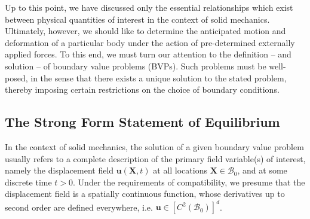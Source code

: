 Up to this point, we have discussed only the essential relationships which exist between physical quantities of interest in the context of solid mechanics. Ultimately, however, we should like to determine the anticipated motion and deformation of a particular body under the action of pre-determined externally applied forces. To this end, we must turn our attention to the definition -- and solution -- of boundary value problems (BVPs). Such problems must be well-posed, in the sense that there exists a unique solution to the stated problem, thereby imposing certain restrictions on the choice of boundary conditions.

\subsection*{The Strong Form Statement of Equilibrium} \label{sec:strongform}

In the context of solid mechanics, the solution of a given boundary value problem usually refers to a complete description of the primary field variable(s) of interest, namely the displacement field $\mathbf{u} (\mathbf{X},t)$ at all locations $\mathbf{X} \in \mathcal{B}_0$, and at some discrete time $t > 0$. Under the requirements of compatibility, we presume that the displacement field is a spatially continuous function, whose derivatives up to second order are defined everywhere, i.e. $\mathbf{u} \in \left[ C^2 (\mathcal{B}_0) \right]^d$.

